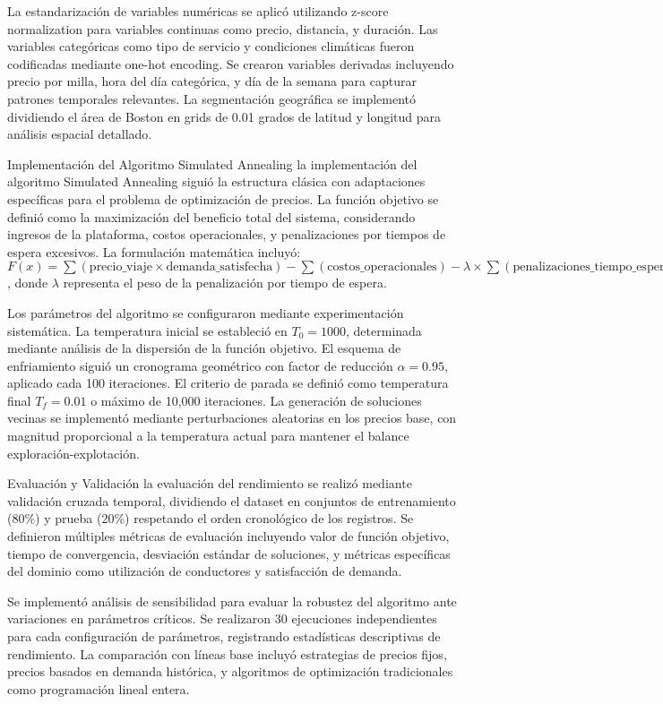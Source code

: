 \documentclass[12pt,a4paper,twocolumn]{article}
\begin{document}
La estandarización de variables numéricas se aplicó utilizando z-score normalization para variables continuas como precio, distancia, y duración. Las variables categóricas como tipo de servicio y condiciones climáticas fueron codificadas mediante one-hot encoding. Se crearon variables derivadas incluyendo precio por milla, hora del día categórica, y día de la semana para capturar patrones temporales relevantes. La segmentación geográfica se implementó dividiendo el área de Boston en grids de 0.01 grados de latitud y longitud para análisis espacial detallado.

Implementación del Algoritmo Simulated Annealing la implementación del algoritmo Simulated Annealing siguió la estructura clásica con adaptaciones específicas para el problema de optimización de precios. La función objetivo se definió como la maximización del beneficio total del sistema, considerando ingresos de la plataforma, costos operacionales, y penalizaciones por tiempos de espera excesivos. La formulación matemática incluyó: $F(x) = \sum(\text{precio\_viaje} \times \text{demanda\_satisfecha}) - \sum(\text{costos\_operacionales}) - \lambda \times \sum(\text{penalizaciones\_tiempo\_espera})$, donde $\lambda$ representa el peso de la penalización por tiempo de espera.

Los parámetros del algoritmo se configuraron mediante experimentación sistemática. La temperatura inicial se estableció en $T_0 = 1000$, determinada mediante análisis de la dispersión de la función objetivo. El esquema de enfriamiento siguió un cronograma geométrico con factor de reducción $\alpha = 0.95$, aplicado cada 100 iteraciones. El criterio de parada se definió como temperatura final $T_f = 0.01$ o máximo de 10,000 iteraciones. La generación de soluciones vecinas se implementó mediante perturbaciones aleatorias en los precios base, con magnitud proporcional a la temperatura actual para mantener el balance exploración-explotación.

Evaluación y Validación la evaluación del rendimiento se realizó mediante validación cruzada temporal, dividiendo el dataset en conjuntos de entrenamiento (80\%) y prueba (20\%) respetando el orden cronológico de los registros. Se definieron múltiples métricas de evaluación incluyendo valor de función objetivo, tiempo de convergencia, desviación estándar de soluciones, y métricas específicas del dominio como utilización de conductores y satisfacción de demanda.

Se implementó análisis de sensibilidad para evaluar la robustez del algoritmo ante variaciones en parámetros críticos. Se realizaron 30 ejecuciones independientes para cada configuración de parámetros, registrando estadísticas descriptivas de rendimiento. La comparación con líneas base incluyó estrategias de precios fijos, precios basados en demanda histórica, y algoritmos de optimización tradicionales como programación lineal entera.
\end{document}
